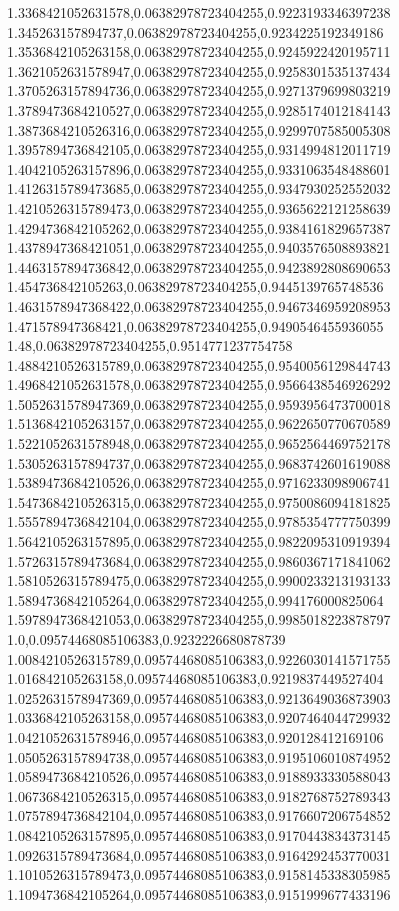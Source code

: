 1.3368421052631578,0.06382978723404255,0.9223193346397238
1.345263157894737,0.06382978723404255,0.9234225192349186
1.3536842105263158,0.06382978723404255,0.9245922420195711
1.3621052631578947,0.06382978723404255,0.9258301535137434
1.3705263157894736,0.06382978723404255,0.9271379699803219
1.3789473684210527,0.06382978723404255,0.9285174012184143
1.3873684210526316,0.06382978723404255,0.9299707585005308
1.3957894736842105,0.06382978723404255,0.9314994812011719
1.4042105263157896,0.06382978723404255,0.9331063548488601
1.4126315789473685,0.06382978723404255,0.9347930252552032
1.4210526315789473,0.06382978723404255,0.9365622121258639
1.4294736842105262,0.06382978723404255,0.9384161829657387
1.4378947368421051,0.06382978723404255,0.9403576508893821
1.4463157894736842,0.06382978723404255,0.9423892808690653
1.454736842105263,0.06382978723404255,0.9445139765748536
1.4631578947368422,0.06382978723404255,0.9467346959208953
1.471578947368421,0.06382978723404255,0.9490546455936055
1.48,0.06382978723404255,0.9514771237754758
1.4884210526315789,0.06382978723404255,0.9540056129844743
1.4968421052631578,0.06382978723404255,0.9566438546926292
1.5052631578947369,0.06382978723404255,0.9593956473700018
1.5136842105263157,0.06382978723404255,0.9622650770670589
1.5221052631578948,0.06382978723404255,0.9652564469752178
1.5305263157894737,0.06382978723404255,0.9683742601619088
1.5389473684210526,0.06382978723404255,0.9716233098906741
1.5473684210526315,0.06382978723404255,0.9750086094181825
1.5557894736842104,0.06382978723404255,0.9785354777750399
1.5642105263157895,0.06382978723404255,0.9822095310919394
1.5726315789473684,0.06382978723404255,0.9860367171841062
1.5810526315789475,0.06382978723404255,0.9900233213193133
1.5894736842105264,0.06382978723404255,0.994176000825064
1.5978947368421053,0.06382978723404255,0.9985018223878797
1.0,0.09574468085106383,0.9232226680878739
1.0084210526315789,0.09574468085106383,0.9226030141571755
1.016842105263158,0.09574468085106383,0.9219837449527404
1.0252631578947369,0.09574468085106383,0.9213649036873903
1.0336842105263158,0.09574468085106383,0.9207464044729932
1.0421052631578946,0.09574468085106383,0.920128412169106
1.0505263157894738,0.09574468085106383,0.9195106010874952
1.0589473684210526,0.09574468085106383,0.9188933330588043
1.0673684210526315,0.09574468085106383,0.9182768752789343
1.0757894736842104,0.09574468085106383,0.9176607206754852
1.0842105263157895,0.09574468085106383,0.9170443834373145
1.0926315789473684,0.09574468085106383,0.9164292453770031
1.1010526315789473,0.09574468085106383,0.9158145338305985
1.1094736842105264,0.09574468085106383,0.9151999677433196
